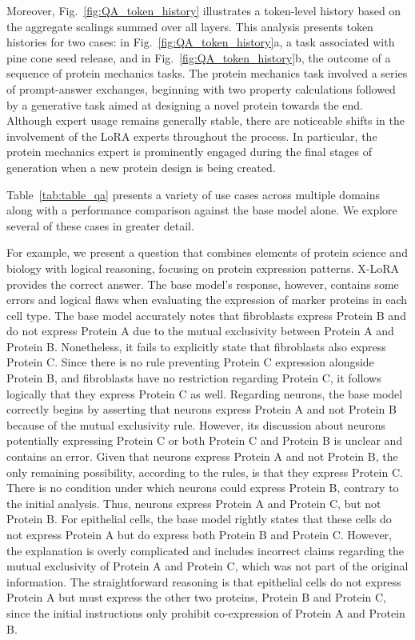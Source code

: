 Moreover, Fig.~\ref{fig:QA_token_history} illustrates a token-level history based on the aggregate scalings summed over all layers. This analysis presents token histories for two cases: in Fig.~\ref{fig:QA_token_history}a, a task associated with pine cone seed release, and in Fig.~\ref{fig:QA_token_history}b, the outcome of a sequence of protein mechanics tasks. The protein mechanics task involved a series of prompt-answer exchanges, beginning with two property calculations followed by a generative task aimed at designing a novel protein towards the end. Although expert usage remains generally stable, there are noticeable shifts in the involvement of the LoRA experts throughout the process. In particular, the protein mechanics expert is prominently engaged during the final stages of generation when a new protein design is being created.

Table~\ref{tab:table_qa} presents a variety of use cases across multiple domains along with a performance comparison against the base model alone. We explore several of these cases in greater detail.

For example, we present a question that combines elements of protein science and biology with logical reasoning, focusing on protein expression patterns. X-LoRA provides the correct answer. The base model’s response, however, contains some errors and logical flaws when evaluating the expression of marker proteins in each cell type. The base model accurately notes that fibroblasts express Protein B and do not express Protein A due to the mutual exclusivity between Protein A and Protein B. Nonetheless, it fails to explicitly state that fibroblasts also express Protein C. Since there is no rule preventing Protein C expression alongside Protein B, and fibroblasts have no restriction regarding Protein C, it follows logically that they express Protein C as well. Regarding neurons, the base model correctly begins by asserting that neurons express Protein A and not Protein B because of the mutual exclusivity rule. However, its discussion about neurons potentially expressing Protein C or both Protein C and Protein B is unclear and contains an error. Given that neurons express Protein A and not Protein B, the only remaining possibility, according to the rules, is that they express Protein C. There is no condition under which neurons could express Protein B, contrary to the initial analysis. Thus, neurons express Protein A and Protein C, but not Protein B. For epithelial cells, the base model rightly states that these cells do not express Protein A but do express both Protein B and Protein C. However, the explanation is overly complicated and includes incorrect claims regarding the mutual exclusivity of Protein A and Protein C, which was not part of the original information. The straightforward reasoning is that epithelial cells do not express Protein A but must express the other two proteins, Protein B and Protein C, since the initial instructions only prohibit co-expression of Protein A and Protein B.

